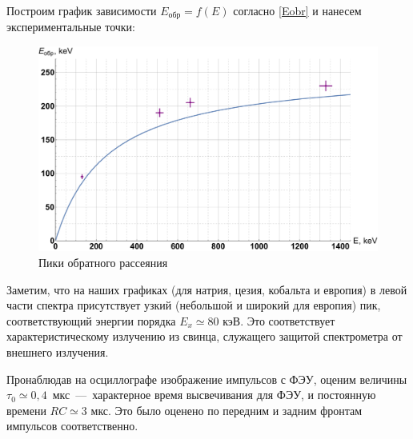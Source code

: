 \documentclass[12pt]{kiarticle}
\begin{document}
Построим график зависимости $ E_{обр} = f(E) $ согласно \eqref{Eobr} и нанесем экспериментальные точки:

	\begin{figure}[H]
	\label{graf_obr}
	\includegraphics[scale=0.45]{ee.pdf}
	\caption{Пики обратного рассеяния}
\end{figure} 

Заметим, что на наших графиках (для натрия, цезия, кобальта и европия) в левой части спектра присутствует узкий (небольшой и широкий для европия) пик, соответствующий энергии порядка $ E_x \simeq 80 $ кэВ. Это соответствует характеристическому излучению из свинца, служащего защитой спектрометра от внешнего излучения. 

Пронаблюдав на осциллографе изображение импульсов с ФЭУ, оценим величины $ \tau_0 \simeq 0,4$~мкс~---~характерное время высвечивания для ФЭУ, и постоянную времени $ RC \simeq 3 $ мкс. Это было оценено по передним и задним фронтам импульсов соответственно. 
	
	
\end{document}
